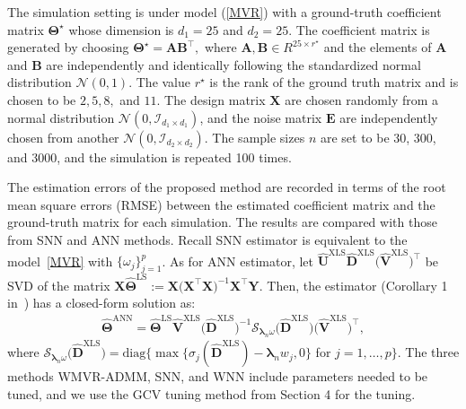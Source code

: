 \documentclass[alpha-refs]{wiley-article}
\begin{document}
The simulation setting is under model (\ref{MVR}) with a ground-truth coefficient matrix $\boldsymbol{\Theta}^{\star}$  whose dimension is $d_{1} = 25$ and $d_{2} = 25$.
The coefficient matrix is generated by choosing $\boldsymbol{\Theta}^{\star}  = \boldsymbol{A}\boldsymbol{B}^{\top},$ where $\boldsymbol{A}, \boldsymbol{B} \in R^{25 \times r^{\star}}$ and the elements of  $\boldsymbol{A}$ and $\boldsymbol{B}$ are independently and identically following the standardized normal distribution $\mathcal{N}(0, 1)$.
The value $r^{\star}$ is the rank of the ground truth matrix and is chosen to be $2, 5, 8,$ and $11$.
The design matrix $\boldsymbol{X}$ are chosen randomly from a normal distribution $\mathcal{N}(0, \mathcal{I}_{ d_{1} \times d_{1}})$, and the noise matrix $\boldsymbol{E}$ are independently chosen from another $\mathcal{N}(0, \mathcal{I}_{ d_{2} \times d_{2}})$.
The sample sizes $n$ are set to be 30, 300, and 3000, and the simulation is repeated 100 times.

The estimation errors of the proposed method are recorded in terms of the root mean square errors (RMSE) between the estimated coefficient matrix and the ground-truth matrix for each simulation.
The results are compared with those from SNN and ANN methods.
Recall SNN estimator is equivalent to the model~\eqref{MVR} with $\{\omega_{j}\}_{j=1}^{p}$.
As for ANN estimator, let $\widehat{\boldsymbol{U}}^{\text{XLS}}\widehat{\boldsymbol{D}}^{\text{XLS}}\big(\widehat{\boldsymbol{V}}^{\text{XLS}}\big)^{\top}$ be SVD of the matrix $\boldsymbol{X}\widehat{\boldsymbol{\Theta}}^{\text{LS}}:=\boldsymbol{X}\big(\boldsymbol{X}^{\top}\boldsymbol{X}\big)^{-1}\boldsymbol{X}^{\top}\boldsymbol{Y}$.
Then, the estimator (Corollary 1 in~\citet{chen2013reduced}) has a closed-form solution as:
\begin{align}
    \widehat{\boldsymbol{\Theta}}^{\text{ANN}} = \widehat{\boldsymbol{\Theta}}^{\text{LS}}
    \widehat{\boldsymbol{V}}^{\text{XLS}} \big(\widehat{\boldsymbol{D}}^{\text{XLS}}\big)^{-1}
    \mathcal{S}_{\boldsymbol{\lambda}_{n}\omega}\big(\widehat{\boldsymbol{D}}^{\text{XLS}}\big)
    \big(\widehat{\boldsymbol{V}}^{\text{XLS}}\big)^{\top},
\end{align}
where $\mathcal{S}_{\boldsymbol{\lambda}_{n}\omega}\big(\widehat{\boldsymbol{D}}^{\text{XLS}}\big)=\text{diag}\bigg\{\max\bigg\{\sigma_{j}(\widehat{\boldsymbol{D}}^{\text{XLS}})-\boldsymbol{\lambda}_{n} w_{j},0 \bigg\}$ for $j=1,\dots,p\bigg\}$. The three methods WMVR-ADMM, SNN, and WNN include parameters needed to be tuned, and we use the GCV tuning method from Section 4 for the tuning.
\end{document}
